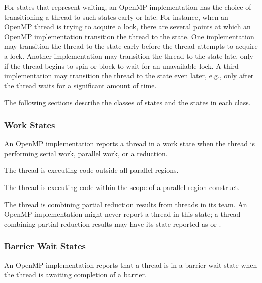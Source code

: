 For states that represent waiting, an OpenMP implementation has the 
choice of transitioning a thread to such states early or late.
For instance, when an OpenMP thread is trying to acquire a lock,
there are several points at which an OpenMP implementation
transition the thread to the  state.
One implementation may transition the thread to the state 
early before the thread attempts to acquire a
lock. Another implementation may transition the thread to the state 
late, only if the thread begins to spin or
block to wait for an unavailable lock. A third implementation
may transition the thread to the state even later, e.g., only
after the thread waits for a significant amount of time. 

The following sections describe the classes of states and the states in each class.
\subsubsection{Work States}
An OpenMP implementation reports a thread in a work state 
when the thread is performing serial work, parallel work, or a reduction.

\begin{description}

\item {} 

  The thread is executing code outside all parallel regions. 

\item {} 

  The thread is executing code within the scope of a parallel region construct.

\sloppy
\item {} 
 
  The thread is combining partial reduction results from threads in its team. 
  An OpenMP implementation  
  might never report a thread in this state; a thread
  combining partial reduction results may have its state reported as
   or .

\end{description}


\subsubsection{Barrier Wait States}

An OpenMP implementation reports that a thread is in a barrier wait state 
when the thread is awaiting completion of a barrier.


